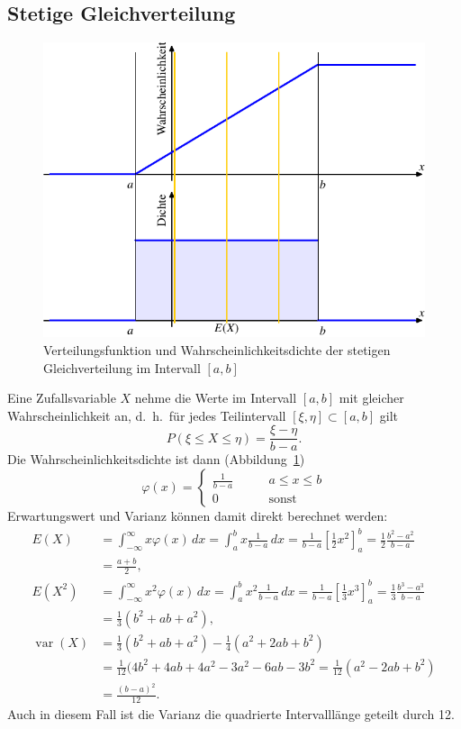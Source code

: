 \subsection{Stetige Gleichverteilung}
\begin{figure}
\centering
\includegraphics{images/verteilungsfunktion-7.pdf}
\caption{Verteilungsfunktion und Wahrscheinlichkeitsdichte der stetigen
Gleichverteilung im Intervall $[a,b]$
\label{stetige-gleichverteilung}}
\end{figure}
Eine Zufallsvariable $X$ nehme die Werte im Intervall $[a,b]$
mit gleicher Wahrscheinlichkeit an, d.~h.~für jedes Teilintervall
$[\xi,\eta]\subset[a,b]$ gilt 
\[
P(\xi\le X\le \eta)=\frac{\xi-\eta}{b-a}.
\]
Die Wahrscheinlichkeitsdichte ist dann (Abbildung~\ref{stetige-gleichverteilung})
\[
\varphi(x)=\begin{cases}
\displaystyle \frac1{b-a}&\qquad a\le x\le b\\
0&\qquad \text{sonst}
\end{cases}
\]
Erwartungswert und Varianz können damit direkt berechnet werden:
{\allowdisplaybreaks
\begin{align*}
E(X)
&=
\int_{-\infty}^\infty x\varphi(x)\,dx
=
\int_a^bx\frac1{b-a}\,dx
=
\frac1{b-a}\left[\frac12x^2\right]_a^b
=
\frac12\frac{b^2-a^2}{b-a}
\\
&=
\frac{a+b}2,
\\
E(X^2)
&=
\int_{-\infty}^{\infty}x^2\varphi(x)\,dx
=
\int_a^bx^2\frac1{b-a}\,dx
=
\frac1{b-a}\left[\frac13x^3\right]_a^b
=
\frac13\frac{b^3-a^3}{b-a}
\\
&=
\frac13(b^2+ab+a^2),
\\
\operatorname{var}(X)
&=
\frac13(b^2+ab+a^2)
-
\frac14(a^2+2ab+b^2)
\\
&=
\frac1{12}(4b^2+4ab+4a^2-3a^2-6ab-3b^2
=
\frac1{12}(a^2-2ab+b^2)
\\
&=
\frac{(b-a)^2}{12}.
\end{align*}
}
Auch in diesem Fall ist die Varianz die quadrierte Intervalllänge
geteilt durch 12.

